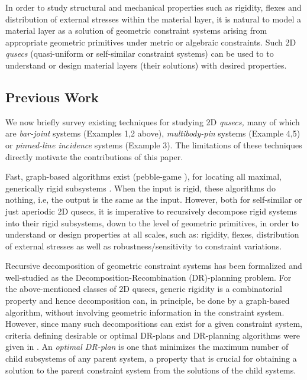 In order to study structural and mechanical properties such as rigidity, flexes and distribution of external stresses 
within the material layer, it is natural to model a material layer as a solution of geometric constraint systems 
arising from appropriate geometric primitives under metric or algebraic constraints. 
Such  2D {\em qusecs} (quasi-uniform or self-similar constraint systems) can be used to 
to understand or design material layers (their solutions) with desired properties.

\subsection{Previous Work}
We now briefly survey existing techniques for studying 2D {\em qusecs,}  many of which are
{\it bar-joint} systems (Examples 1,2 above), {\it multibody-pin} systems (Example 4,5) or {\it pinned-line incidence} systems (Example 3). 
The limitations of these techniques directly motivate the contributions of this paper.

Fast, graph-based algorithms exist (pebble-game \cite{XX}),   
for locating all maximal, generically rigid subsystems \cite{XX}. 
When the input is rigid, these algorithms do nothing, i.e, the output is the same as the input.
However, both for self-similar or just aperiodic 2D qusecs, it is imperative to recursively decompose rigid systems 
into their rigid subsystems, down to the level of geometric primitives, in order to 
understand or design properties at all scales, such as: rigidity, flexes, distribution 
of external stresses as well as robustness/sensitivity to constraint variations.
 
Recursive decomposition of geometric constraint systems has been formalized \cite{XX} and well-studied \cite{XX} 
as the Decomposition-Recombination (DR)-planning problem.
For the above-mentioned classes of 2D qusecs, generic rigidity is 
a combinatorial property and hence decomposition can, in principle, be done by a graph-based algorithm, without
involving geometric information in the constraint system.  
However, since many  such decompositions can exist for a given constraint system, 
criteria defining desirable or optimal DR-plans and DR-planning algorithms were given in \cite{XX}. An {\em optimal DR-plan} is one
that minimizes the maximum number of child subsystems of any parent system, a property that is 
crucial for obtaining a solution to the parent constraint system from the solutions of the child systems.


